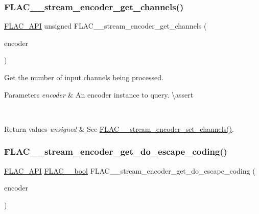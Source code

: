 \subsubsection{\texorpdfstring{FLAC\_\_stream\_encoder\_get\_channels()}{FLAC\_\_stream\_encoder\_get\_channels()}}
{\footnotesize\ttfamily \mbox{\hyperlink{group__flac__export_ga56ca07df8a23310707732b1c0007d6f5}{F\+L\+A\+C\+\_\+\+A\+PI}} unsigned F\+L\+A\+C\+\_\+\+\_\+stream\+\_\+encoder\+\_\+get\+\_\+channels (\begin{DoxyParamCaption}\item[{const \mbox{\hyperlink{struct_f_l_a_c_____stream_encoder}{F\+L\+A\+C\+\_\+\+\_\+\+Stream\+Encoder}} $\ast$}]{encoder }\end{DoxyParamCaption})}

Get the number of input channels being processed.


\begin{DoxyParams}{Parameters}
{\em encoder} & An encoder instance to query. \textbackslash{}assert 
\begin{DoxyCode}{1}
\end{DoxyCode}
 \\
\hline
\end{DoxyParams}

\begin{DoxyRetVals}{Return values}
{\em unsigned} & See \mbox{\hyperlink{group__flac__stream__encoder_gabfc9c883c124a849b5b42a87c30e10a5}{F\+L\+A\+C\+\_\+\+\_\+stream\+\_\+encoder\+\_\+set\+\_\+channels()}}. \\
\hline
\end{DoxyRetVals}
\mbox{\label{group__flac__stream__encoder_ga06a8e154139880a2def5f54b6c2700d6}} 
\subsubsection{\texorpdfstring{FLAC\_\_stream\_encoder\_get\_do\_escape\_coding()}{FLAC\_\_stream\_encoder\_get\_do\_escape\_coding()}}
{\footnotesize\ttfamily \mbox{\hyperlink{group__flac__export_ga56ca07df8a23310707732b1c0007d6f5}{F\+L\+A\+C\+\_\+\+A\+PI}} \mbox{\hyperlink{ordinals_8h_a95103469f1cbd78b8cf250194985b34e}{F\+L\+A\+C\+\_\+\+\_\+bool}} F\+L\+A\+C\+\_\+\+\_\+stream\+\_\+encoder\+\_\+get\+\_\+do\+\_\+escape\+\_\+coding (\begin{DoxyParamCaption}\item[{const \mbox{\hyperlink{struct_f_l_a_c_____stream_encoder}{F\+L\+A\+C\+\_\+\+\_\+\+Stream\+Encoder}} $\ast$}]{encoder }\end{DoxyParamCaption})}


